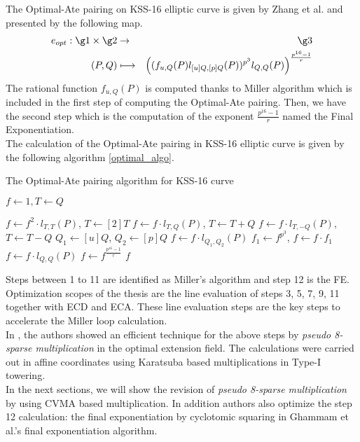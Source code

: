The Optimal-Ate pairing on KSS-16 elliptic curve is given by Zhang et al. \cite{INDOCRYPT:ZhaLin12} and presented by the following map.
\begin{eqnarray*}
  e_{opt}: \g1\times \g2 &\rightarrow & \g3 \\
  (P,Q) &\longmapsto &\left(( f_{u,Q}(P)l_{[u]Q,[p]Q}(P))^{p^3}l_{Q,Q}(P)\right)^{\frac{p^{16}-1}{r}}
\end{eqnarray*}
The rational function $f_{u,Q}(P)$ is computed thanks to Miller algorithm which is included in the first step of computing the Optimal-Ate pairing. Then, we have the second step which is the computation of the exponent $\frac{p^{16}-1}{r}$ named the Final Exponentiation.\\
The calculation of the Optimal-Ate pairing in KSS-16 elliptic curve is given by the following algorithm \ref{optimal_algo}.
\begin{algorithm}[!h]
	\caption{The Optimal-Ate pairing algorithm for KSS-16 curve}
	\label{optimal_algo}
	\DontPrintSemicolon
	\hspace{-3ex}
	\hspace{-3ex}
	\nl $f \leftarrow 1,T \leftarrow Q$
	
	\nl {} {
		\nl $f\leftarrow f^2\cdot l_{T,T}(P)$, $T\leftarrow [2]T$ 
		\nl {} {
			\nl $f\leftarrow f\cdot l_{T,Q}(P)$, $T\leftarrow T+Q$ }
		\nl {} {
			\nl $f\leftarrow f\cdot l_{T,-Q}(P)$, $T\leftarrow T-Q$} } 
	\nl $Q_1\leftarrow [u]Q$, $Q_2\leftarrow [p]Q$ \;
	\nl $f\leftarrow f\cdot l_{Q_1,Q_2}(P)$ \;
	\nl $f_1\leftarrow f^{p^3}$, $f\leftarrow f\cdot f_1$ \;
	\nl $f\leftarrow f\cdot l_{Q,Q}(P)$ \;
	\nl $f\leftarrow f^{\frac{p^{16}-1}{r}}$\;
	 $f$\;
\end{algorithm}

Steps between  1 to 11 are identified as Miller's algorithm and step 12 is the FE.
Optimization scopes of the thesis are the line evaluation of steps 3, 5, 7, 9, 11 together with ECD and ECA.
These line evaluation steps are the key steps to accelerate the Miller loop calculation. \\
In \cite{INDOCRYPT:KNGDNK17}, the authors showed an efficient technique for the above steps by \textit{pseudo 8-sparse multiplication} in the optimal extension field. 
The calculations were carried out in affine coordinates using Karatsuba based multiplications in Type-I towering. \\
In the next sections, we will show the revision of \textit{pseudo 8-sparse multiplication} by using CVMA based multiplication.
In addition authors also optimize the step 12 calculation: the final exponentiation  by cyclotomic squaring \cite{PKC:GraSco10} in Ghammam et al.'s \cite{EPRINT:GhaFou16b} final exponentiation algorithm.

